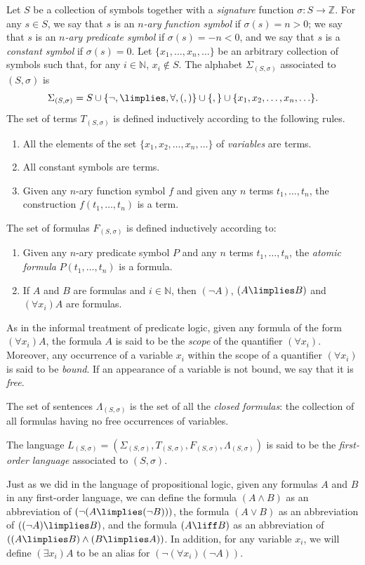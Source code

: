 \begin{definition}
Let $S$ be a collection of symbols together with a \emph{signature} function $\sigma : S \longrightarrow \mathbb{Z}$. For any $s\in S$, we say that $s$ is an \emph{$n$-ary function symbol} if $\sigma(s) = n > 0$; we say that $s$ is an \emph{$n$-ary predicate symbol} if $\sigma(s) = -n < 0$, and we say that $s$ is a \emph{constant symbol} if $\sigma(s) = 0$.
Let $\{x_1,\ldots,x_n,\ldots\}$ be an arbitrary collection of symbols such that, for any $i\in\mathbb{N}$, $x_i\not\in S$.
The alphabet $\Sigma_{(S,\sigma)}$ associated to $(S,\sigma)$ is 
\[\Sigma_{(S,\sigma)} = S\cup \{\lnot,\limplies,\forall,(,)\} \cup \{,\} \cup \{x_1,x_2,\ldots,x_n,\ldots\}.\]
The set of terms $T_{(S,\sigma)}$ is defined inductively according to the following rules.
\begin{enumerate}
\item All the elements of the set $\{x_1,x_2,\ldots,x_n,\ldots\}$ of \emph{variables} are terms.
\item All constant symbols are terms.
\item Given any $n$-ary function symbol $f$ and given any $n$ terms $t_1,\ldots,t_n$, the construction $f(t_1,\ldots,t_n)$ is a term.
\end{enumerate}
The set of formulas $F_{(S,\sigma)}$ is defined inductively according to:
\begin{enumerate}
\item Given any $n$-ary predicate symbol $P$ and any $n$ terms $t_1,\ldots,t_n$, the \emph{atomic formula} $P(t_1,\ldots,t_n)$ is a formula.
\item If $A$ and $B$ are formulas and $i\in\mathbb{N}$, then $(\lnot A)$, $(A\limplies B)$ and $(\forall x_i) A$ are formulas.
\end{enumerate}

As in the informal treatment of predicate logic, given any formula of the form $(\forall x_i) A$, the formula $A$ is said to be the \emph{scope} of the quantifier $(\forall x_i)$.
Moreover, any occurrence of a variable $x_i$ within the scope of a quantifier $(\forall x_i)$ is said to be \emph{bound}.
If an appearance of a variable is not bound, we say that it is \emph{free}.

The set of sentences $\Lambda_{(S,\sigma)}$ is the set of all the \emph{closed formulas}: the collection of all formulas having no free occurrences of variables.

The language $L_{(S,\sigma)} = (\Sigma_{(S,\sigma)}, T_{(S,\sigma)}, F_{(S,\sigma)}, \Lambda_{(S,\sigma)})$ is said to be the \emph{first-order language} associated to $(S,\sigma)$. 

Just as we did in the language of propositional logic, given any formulas $A$ and $B$ in any first-order language, we can define the formula $(A\land B)$ as an abbreviation of $(\lnot(A\limplies (\lnot B)))$, the formula $(A\lor B)$ as an abbreviation of $((\lnot A )\limplies B)$, and the formula $(A\liff B)$ as an abbreviation of $((A\limplies B) \land (B\limplies A))$.
In addition, for any variable $x_i$, we will define $(\exists x_i) A$ to be an alias for $(\lnot(\forall x_i)(\lnot A))$.
\end{definition}

